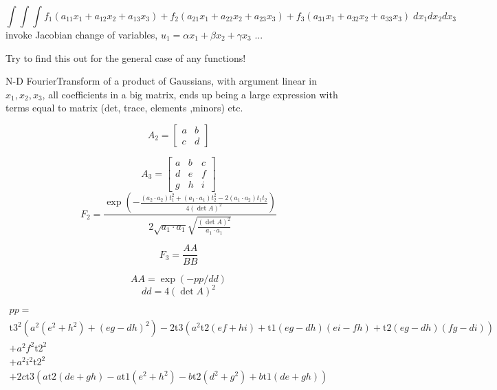 \documentclass{article}
\begin{document}
$$
\int \int \int f_1(a_{11} x_1 + a_{12} x_2 + a_{13} x_3) + f_2(a_{21} x_1 + a_{22} x_2 + a_{23} x_3) + f_3( a_{31} x_1 + a_{32} x_2 + a_{33} x_3) \; dx_1 d x_2 d x_3
$$
invoke Jacobian change of variables, $u_1 = \alpha x_1 + \beta x_2 + \gamma x_3$ ... 

Try to find this out for the general case of any functions!

N-D FourierTransform of a product of Gaussians, with argument linear in $x_1,x_2,x_3$, all coefficients in a big matrix, ends up being a large expression with terms equal to matrix (det, trace, elements ,minors) etc.



$$
A_2 = \begin{bmatrix}
a&b \\ c& d
\end{bmatrix}
$$

$$
A_3 = \begin{bmatrix}
a & b & c \\
d & e & f \\
g & h & i
\end{bmatrix}
$$
$$
F_2 = 
\frac{\exp \left(-\frac{(a_2 \cdot a_2 )t_1^2 + (a_1 \cdot a_1 ) t_2^2 -2 (a_1 \cdot a_2) t_1 t_2}{4 (\det A)^2}\right)}{2 \sqrt{a_1 \cdot a_1}
    \sqrt{\frac{(\det A)^2}{a_1 \cdot a_1 }}}
$$
    
$$
F_3 = \frac{AA}{BB}
$$

$$
AA = \exp(-pp/dd)
$$
$$
dd = 4 (\det A)^2
$$

\begin{align}
pp = \\
\text{t3}^2 \left(a^2 \left(e^2+h^2\right)+(e g-d h)^2\right)
-2 \text{t3} \left(a^2 \text{t2} (e f+h i)+\text{t1} (e g-d h) (e i-f h)+\text{t2} (e g-d h) (f g-d i)\right)\\
+a^2 f^2 \text{t2}^2 \\
+a^2 i^2 \text{t2}^2 \\
+2 c \text{t3} \left(a \text{t2} (d e+g h) -a \text{t1} \left(e^2+h^2\right)-b \text{t2} \left(d^2+g^2\right)+b \text{t1} (d e+g h)\right)
\end{align}
\end{document}
